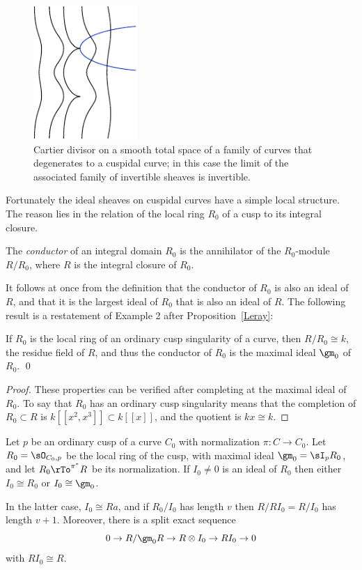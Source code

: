 \begin{figure}
\centerline {\includegraphics[height=2in]{"main/Fig13-1"}}
\caption{Cartier divisor on a smooth total space of a family of curves that degenerates to a cuspidal curve; in this case the
limit of the associated family of invertible sheaves is invertible.}
\label{Fig13.1}
\end{figure}

Fortunately the ideal sheaves on cuspidal curves have a simple local structure. The reason lies in the relation of the local ring $R_{0}$ of a cusp to its integral closure. 

\begin{definition}
The \emph{conductor} of an integral domain $R_{0}$ is the annihilator of the $R_{0}$-module
$R/R_{0}$, where $R$ is the integral closure of $R_{0}$.
\end{definition}

It follows at once from the definition that the conductor of $R_{0}$ is also an ideal of $R$, and that it is the largest ideal of $R_{0}$ that is also
an ideal of $R$. The following result is a restatement of Example 2 after Proposition~\ref{Leray}:

\begin{proposition}\label{conductor of node and cusp}
If $R_{0}$ is the local ring of an ordinary cusp singularity of a curve, then  $R/R_{0} \cong k$, the residue field of $R$, and thus the conductor of $R_{0}$ is the
maximal ideal $\gm_{0}$ of $R_{0}$. \qed
\end{proposition}

\begin{proof} These properties can be verified after completing at the maximal ideal of $R_{0}$.
To say 
that $R_0$ has an ordinary cusp singularity means that the completion of 
$R_0 \subset R$ is $k[[x^2,x^3]]\subset k[[x]]$, and the quotient is $kx \cong k$.
\end{proof}


\begin{theorem}\label{torsion free at node}
Let $p$ be an ordinary cusp of a curve $C_0$ with normalization $\pi: C \to C_0$. Let $R_0 = \sO_{C_0,p}$ be the local ring of the cusp, with maximal ideal $\gm_0 = \sI_{p}R_{0}$,
and let $R_{0}\rTo^{\pi^{*}} R$ be its normalization.  If $I_{0}\neq 0$ is an ideal of $R_{0}$ then 
either $I_{0}\cong R_{0}$ or $I_{0}\cong \gm_0$.

 In the latter case, $I_{0} \cong Ra$, and if $R_{0}/I_{0}$ has length $v$ then $R/RI_{0} = R/I_{0}$ has length $v+1$.
 Moreover,
there is a split exact sequence
$$
0\to R/\gm_0 R \to R \otimes I_{0}  \to R I_{0} \to 0
$$
with $RI_{0}  \cong R$.
\end{theorem}

